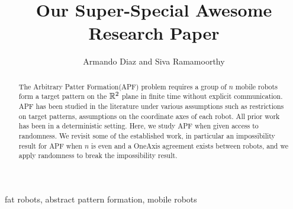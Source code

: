 \documentclass[preprint,10pt]{elsarticle}
\begin{document}

\begin{frontmatter}



\title{Our Super-Special Awesome Research Paper}


\author{Armando Diaz and Siva Ramamoorthy}

\address{\{ ajdt, sivanr\}@cs.washington.edu}

\begin{abstract}
The Arbitrary Patter Formation(APF) problem requires a group of $n$  mobile robots form a  target pattern on 
the $\mathbb{R}^2$ plane in finite time without explicit communication. 
APF has been studied in the literature under various
assumptions such as restrictions on target patterns, assumptions on the coordinate 
axes of each robot. All prior work has been in a deterministic setting. 
Here, we study APF when given access to randomness.
We revisit some of the established work, in particular an impossibility result for APF 
when $n$ is even and a OneAxis agreement exists between robots, and we apply randomness to break the impossibility result. 
\end{abstract}

\begin{keyword}
fat robots, abstract pattern formation, mobile robots
\end{keyword}

\end{frontmatter}
\end{document}
